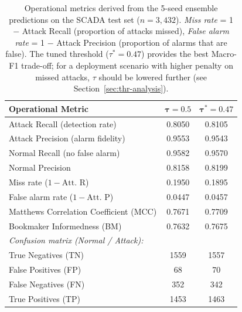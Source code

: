 
\begin{table}[htbp]
\centering
\caption{Operational metrics derived from the 5-seed ensemble predictions
on the SCADA test set ($n=3{,}432$).
\emph{Miss rate} = 1 $-$ Attack Recall (proportion of attacks missed),
\emph{False alarm rate} = 1 $-$ Attack Precision (proportion of alarms that are
false). The tuned threshold ($\tau^*=0.47$) provides the best
Macro-F1 trade-off; for a deployment scenario with higher penalty on missed
attacks, $\tau$ should be lowered further (see Section~\ref{sec:thr-analysis}).}
\label{tab:ops-metrics}
\setlength{\tabcolsep}{6pt}
\renewcommand{\arraystretch}{1.15}
\small
\begin{tabular}{l c c}
\hline\hline
\textbf{Operational Metric} & $\boldsymbol{\tau=0.5}$ & $\boldsymbol{\tau^*=0.47}$ \\
\hline
Attack Recall (detection rate)    & 0.8050 & 0.8105 \\
Attack Precision (alarm fidelity) & 0.9553 & 0.9543 \\
Normal Recall (no false alarm)    & 0.9582 & 0.9570 \\
Normal Precision                  & 0.8158 & 0.8199 \\
\hline
Miss rate ($1 - \text{Att.~R}$)                       & 0.1950 & 0.1895 \\
False alarm rate ($1 - \text{Att.~P}$)                 & 0.0447 & 0.0457 \\
Matthews Correlation Coefficient (MCC)                 & 0.7671 & 0.7709 \\
Bookmaker Informedness (BM)                           & 0.7632 & 0.7675 \\
\hline
\multicolumn{3}{l}{\textit{Confusion matrix (Normal / Attack):}} \\
True Negatives  (TN)             & 1559 & 1557 \\
False Positives (FP)             & 68   & 70   \\
False Negatives (FN)             & 352  & 342  \\
True Positives  (TP)             & 1453 & 1463 \\
\hline\hline
\end{tabular}
\end{table}